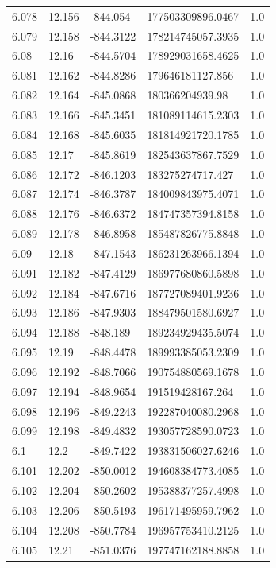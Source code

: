 \begin{tabular}{lllll}
6.078 & 12.156 & -844.054 & 177503309896.0467 & 1.0 \\
6.079 & 12.158 & -844.3122 & 178214745057.3935 & 1.0 \\
6.08 & 12.16 & -844.5704 & 178929031658.4625 & 1.0 \\
6.081 & 12.162 & -844.8286 & 179646181127.856 & 1.0 \\
6.082 & 12.164 & -845.0868 & 180366204939.98 & 1.0 \\
6.083 & 12.166 & -845.3451 & 181089114615.2303 & 1.0 \\
6.084 & 12.168 & -845.6035 & 181814921720.1785 & 1.0 \\
6.085 & 12.17 & -845.8619 & 182543637867.7529 & 1.0 \\
6.086 & 12.172 & -846.1203 & 183275274717.427 & 1.0 \\
6.087 & 12.174 & -846.3787 & 184009843975.4071 & 1.0 \\
6.088 & 12.176 & -846.6372 & 184747357394.8158 & 1.0 \\
6.089 & 12.178 & -846.8958 & 185487826775.8848 & 1.0 \\
6.09 & 12.18 & -847.1543 & 186231263966.1394 & 1.0 \\
6.091 & 12.182 & -847.4129 & 186977680860.5898 & 1.0 \\
6.092 & 12.184 & -847.6716 & 187727089401.9236 & 1.0 \\
6.093 & 12.186 & -847.9303 & 188479501580.6927 & 1.0 \\
6.094 & 12.188 & -848.189 & 189234929435.5074 & 1.0 \\
6.095 & 12.19 & -848.4478 & 189993385053.2309 & 1.0 \\
6.096 & 12.192 & -848.7066 & 190754880569.1678 & 1.0 \\
6.097 & 12.194 & -848.9654 & 191519428167.264 & 1.0 \\
6.098 & 12.196 & -849.2243 & 192287040080.2968 & 1.0 \\
6.099 & 12.198 & -849.4832 & 193057728590.0723 & 1.0 \\
6.1 & 12.2 & -849.7422 & 193831506027.6246 & 1.0 \\
6.101 & 12.202 & -850.0012 & 194608384773.4085 & 1.0 \\
6.102 & 12.204 & -850.2602 & 195388377257.4998 & 1.0 \\
6.103 & 12.206 & -850.5193 & 196171495959.7962 & 1.0 \\
6.104 & 12.208 & -850.7784 & 196957753410.2125 & 1.0 \\
6.105 & 12.21 & -851.0376 & 197747162188.8858 & 1.0 \\

\end{tabular}
